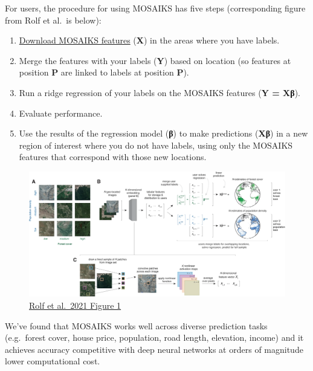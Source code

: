\documentclass[
  letterpaper,
  DIV=11,
  numbers=noendperiod]{scrreprt}
\begin{document}
For users, the procedure for using MOSAIKS has five steps (corresponding
figure from Rolf et al.~is below):

\begin{enumerate}
\def\labelenumi{\arabic{enumi}.}
\item
  \href{https://api.mosaiks.org/}{Download MOSAIKS features}
  (\textbf{X}) in the areas where you have labels.
\item
  Merge the features with your labels (\textbf{Y}) based on location (so
  features at position \textbf{P} are linked to labels at position
  \textbf{P}).
\item
  Run a ridge regression of your labels on the MOSAIKS features
  (\textbf{Y = Xβ}).
\item
  Evaluate performance.
\item
  Use the results of the regression model (\textbf{β}) to make
  predictions (\textbf{Xβ}) in a new region of interest where you do not
  have labels, using only the MOSAIKS features that correspond with
  those new locations.
\end{enumerate}

\begin{figure}

{\centering \includegraphics{images/rolf_et_al_2021-Fig_1.jpg}

}

\caption{\href{https://www.nature.com/articles/s41467-021-24638-z/figures/1}{Rolf
et al.~2021 Figure 1}}

\end{figure}

We've found that MOSAIKS works well across diverse prediction tasks
(e.g.~forest cover, house price, population, road length, elevation,
income) and it achieves accuracy competitive with deep neural networks
at orders of magnitude lower computational cost.
\end{document}
